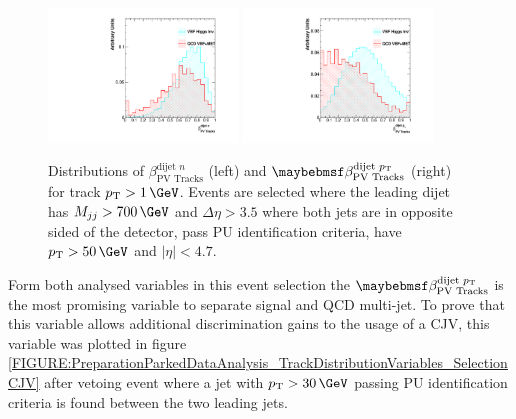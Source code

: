 \begin{figure}[!htb]
\centering
\includegraphics[width=0.45\textwidth]{Chapter06/TrackVariables/Images/Tracks1_TracksNRatio.pdf} 
\includegraphics[width=0.45\textwidth]{Chapter06/TrackVariables/Images/Tracks1_TracksERatio.pdf}
\caption{Distributions of $\beta_{\text{PV Tracks}}^{\text{dijet }n}$ (left) and $\beta_{\text{PV Tracks}}^{\text{dijet }\pt}$ (right) for track $\pt>1\,\GeV$. Events are selected where the leading dijet has $M_{jj}>700\,\GeV$ and $\Delta\eta>3.5$ where both jets are in opposite sided of the detector, pass \gls{PU} identification criteria, have $\pt>50\,\GeV$ and $|\eta|<4.7$.}
\label{FIGURE:PreparationParkedDataAnalysis_TrackDistributionVariables_Selection}
\end{figure}

Form both analysed variables in this event selection the $\beta_{\text{PV Tracks}}^{\text{dijet }\pt}$ is the most promising variable to separate signal and \gls{QCD} multi-jet. To prove that this variable allows additional discrimination gains to the usage of a \gls{CJV}, this variable was plotted in figure \ref{FIGURE:PreparationParkedDataAnalysis_TrackDistributionVariables_SelectionCJV} after vetoing event where a jet with  $\pt>30\,\GeV$ passing \gls{PU} identification criteria is found between the two leading jets.

